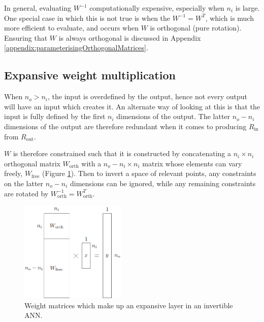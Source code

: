 \documentclass[../../main.tex]{subfiles}
\begin{document}
In general, evaluating $W^{-1}$ computationally expensive, especially when $n_i$ is large.
One special case in which this is not true is when the $W^{-1}=W^T$, which is much more efficient to evaluate, and occurs when $W$ is orthogonal (pure rotation).
Ensuring that $W$ is always orthogonal is discussed in Appendix \ref{appendix:parameterisingOrthogonalMatrices}.

\subsection{Expansive weight multiplication} \label{subsection:expansiveWeightMultiplication}

When $n_o>n_i$, the input is overdefined by the output, hence not every output will have an input which creates it.
An alternate way of looking at this is that the input is fully defined by the first $n_i$ dimensions of the output.
The latter $n_o-n_i$ dimensions of the output are therefore redundant when it comes to producing $R_\text{in}$ from $R_\text{out}$.

$W$ is therefore constrained such that it is constructed by concatenating a $n_i\times n_i$ orthogonal matrix $W_\text{orth}$ with a $n_o-n_i\times n_i$ matrix whose elements can vary freely, $W_\text{free}$ (Figure \ref{fig:expansiveLayer}).
Then to invert a space of relevant points, any constraints on the latter $n_o-n_i$ dimensions can be ignored, while any remaining constraints are rotated by $W_\text{orth}^{-1}=W_\text{orth}^T$.
\begin{figure}[H]
    \begin{center}
    \includegraphics[width=0.45\textwidth]{expansiveLayer}
    \caption[Expansive layer of an invertible ANN]{
        Weight matrices which make up an expansive layer in an invertible ANN.
    }
    \label{fig:expansiveLayer}
    \end{center}
\end{figure}
\end{document}
